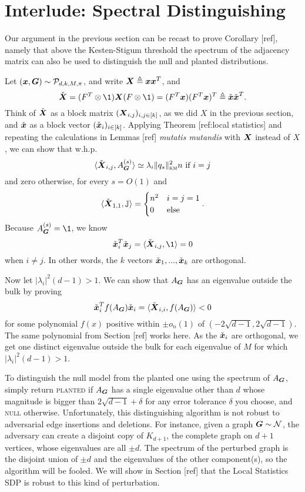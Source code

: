 \section{Interlude: Spectral Distinguishing} %
\label{sec:interlude_spectral_distinguishing}

Our argument in the previous section can be recast to prove Corollary [ref], namely that above the Kesten-Stigum threshold the spectrum of the adjacency matrix can also be used to distinguish the null and planted distributions. 

Let $({\boldsymbol{x}},\boldsymbol{G}) \sim \mathcal{P}_{d,k,M,\pi}$, and write $\boldsymbol{X} \triangleq {\boldsymbol{x}} {\boldsymbol{x}}^T$, and 
$$
 \check \bX = (F^T \otimes \1)\bX (F \otimes \1) = (F^T \bx)(F^T\bx)^T \triangleq \check \bx \check \bx^T.
$$ 
Think of $\check {\boldsymbol{X}}$ as a block matrix $(\boldsymbol{X}_{i,j})_{i,j \in [k]}$, as we did $X$ in the previous section, and $\check {{\boldsymbol{x}}}$ as a block vector $(\check {{\boldsymbol{x}}}_i)_{i\in [k]}$. Applying Theorem [ref:local statistics] and repeating the calculations in Lemmas [ref] \textit{mutatis mutandis} with $\boldsymbol{X}$ instead of $X$, we can show  that w.h.p.
$$
    \langle \check {\boldsymbol{X}}_{i,j}, A^{(s)}_{\boldsymbol{G}} \rangle \simeq \lambda_i \|q_s\|^2_{\textsc{km}} n \text{ if $i=j$}
$$
and zero otherwise, for every $s = O(1)$ and
$$
    \langle \check {\boldsymbol{X}}_{1,1}, \mathbb{J} \rangle = \begin{cases} n^2 & i=j=1 \\ 0 & \text{else} \end{cases}.
$$
Because $\nb{s}{\bG} =\1$, we know 
$$
    \check \bx_i^T \check \bx_j = \langle \check \bX_{i,j}, \1 \rangle = 0
$$
when $i\neq j$. In other words, the $k$ vectors $\check {{\boldsymbol{x}}}_1,...,\check {{\boldsymbol{x}}}_k$ are orthogonal.

Now let $|\lambda_i|^2(d-1) > 1$. We can show that $A_{\boldsymbol{G}}$ has an eigenvalue outside the bulk by proving 
$$
\check{{\boldsymbol{x}}}_i^T f(A_{\boldsymbol{G}})\check{{\boldsymbol{x}}}_i = \langle \check {\boldsymbol{X}}_{i,i}, f(A_{\boldsymbol{G}}) \rangle < 0
$$ 
for some polynomial $f(x)$ positive within $\pm o_n(1)$ of $(-2\sqrt{d-1},2\sqrt{d-1})$. The same polynomial from Section [ref] works here. As the $\check {{\boldsymbol{x}}}_i$ are orthogonal, we get one distinct eigenvalue outside the bulk for each eigenvalue of $M$ for which $|\lambda_i|^2(d-1) > 1$.

\begin{remark}
    To distinguish the null model from the planted one using the spectrum of $A_{\boldsymbol{G}}$, simply return \textsc{planted} if $A_{\boldsymbol{G}}$ has a single eigenvalue other than $d$ whose magnitude is bigger than $2\sqrt{d-1} + \delta$ for any error tolerance $\delta$ you choose, and \textsc{null} otherwise. Unfortunately, this distinguishing algorithm is not robust to adversarial edge insertions and deletions. For instance, given a graph $\boldsymbol{G} \sim \mathcal{N}$, the adversary can create a disjoint copy of $K_{d+1}$, the complete graph on $d+1$ vertices, whose eigenvalues are all $\pm d$. The spectrum of the perturbed graph is the disjoint union of $\pm d$ and the eigenvalues of the other component(s), so the algorithm will be fooled.  We will show in Section [ref] that the Local Statistics SDP is robust to this kind of perturbation.
\end{remark}

